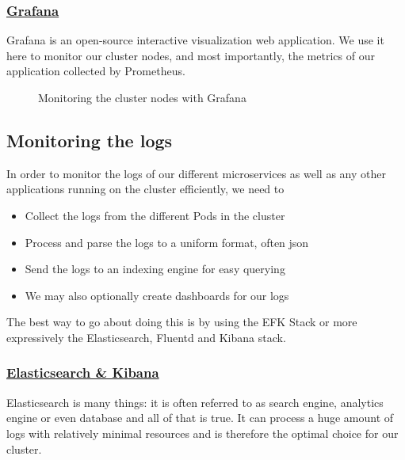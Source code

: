 \subsubsection*{\underline{Grafana}}
Grafana is an open-source interactive visualization web application.
We use it here to monitor our cluster nodes, and most importantly, the metrics of our application collected by Prometheus.
\begin{figure}[H]
    \centering
    \caption{Monitoring the cluster nodes with Grafana}
    \label{fig:grafana-node-monitoring}
\end{figure}

\subsection{Monitoring the logs}
In order to monitor the logs of our different microservices as well as any other applications running on the cluster efficiently, we need to

\begin{itemize}
    \item Collect the logs from the different Pods in the cluster
    \item Process and parse the logs to a uniform format, often json
    \item Send the logs to an indexing engine for easy querying
    \item We may also optionally create dashboards for our logs
\end{itemize}
The best way to go about doing this is by using the EFK Stack or more expressively the Elasticsearch, Fluentd and Kibana stack.

\subsubsection*{\underline{Elasticsearch \& Kibana}}
Elasticsearch is many things: it is often referred to as search engine, analytics engine or even database and all of that is true.
It can process a huge amount of logs with relatively minimal resources and is therefore the optimal choice for our cluster.

